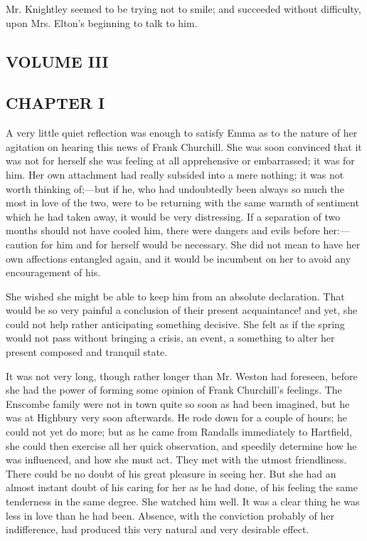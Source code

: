 Mr. Knightley seemed to be trying not to smile; and succeeded without difficulty, upon Mrs. Elton's beginning to talk to him.

\subsection[volume-iii]{\useURL[url38][][][]\from[url38]VOLUME III}

\subsection[chapter-i-2]{\useURL[url39][][][]\from[url39]CHAPTER I}

A very little quiet reflection was enough to satisfy Emma as to the nature of her agitation on hearing this news of Frank Churchill. She was soon convinced that it was not for herself she was feeling at all apprehensive or embarrassed; it was for him. Her own attachment had really subsided into a mere nothing; it was not worth thinking of;---but if he, who had undoubtedly been always so much the most in love of the two, were to be returning with the same warmth of sentiment which he had taken away, it would be very distressing. If a separation of two months should not have cooled him, there were dangers and evils before her:---caution for him and for herself would be necessary. She did not mean to have her own affections entangled again, and it would be incumbent on her to avoid any encouragement of his.

She wished she might be able to keep him from an absolute declaration. That would be so very painful a conclusion of their present acquaintance! and yet, she could not help rather anticipating something decisive. She felt as if the spring would not pass without bringing a crisis, an event, a something to alter her present composed and tranquil state.

It was not very long, though rather longer than Mr. Weston had foreseen, before she had the power of forming some opinion of Frank Churchill's feelings. The Enscombe family were not in town quite so soon as had been imagined, but he was at Highbury very soon afterwards. He rode down for a couple of hours; he could not yet do more; but as he came from Randalls immediately to Hartfield, she could then exercise all her quick observation, and speedily determine how he was influenced, and how she must act. They met with the utmost friendliness. There could be no doubt of his great pleasure in seeing her. But she had an almost instant doubt of his caring for her as he had done, of his feeling the same tenderness in the same degree. She watched him well. It was a clear thing he was less in love than he had been. Absence, with the conviction probably of her indifference, had produced this very natural and very desirable effect.

